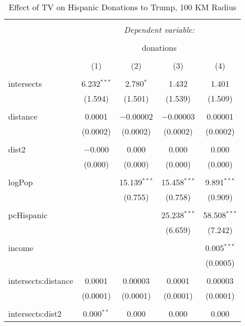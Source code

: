 
\begin{table}[!htbp] \centering 
  \caption{Effect of TV on Hispanic Donations to Trump, 100 KM Radius} 
  \label{} 
\begin{tabular}{@{\extracolsep{-5pt}}lcccc} 
\\[-1.8ex]\hline 
\hline \\[-1.8ex] 
 & \multicolumn{4}{c}{\textit{Dependent variable:}} \\ 
\cline{2-5} 
\\[-1.8ex] & \multicolumn{4}{c}{donations} \\ 
\\[-1.8ex] & (1) & (2) & (3) & (4)\\ 
\hline \\[-1.8ex] 
 intersects & 6.232$^{***}$ & 2.780$^{*}$ & 1.432 & 1.401 \\ 
  & (1.594) & (1.501) & (1.539) & (1.509) \\ 
  & & & & \\ 
 distance & 0.0001 & $-$0.00002 & $-$0.00003 & 0.00001 \\ 
  & (0.0002) & (0.0002) & (0.0002) & (0.0002) \\ 
  & & & & \\ 
 dist2 & $-$0.000 & 0.000 & 0.000 & 0.000 \\ 
  & (0.000) & (0.000) & (0.000) & (0.000) \\ 
  & & & & \\ 
 logPop &  & 15.139$^{***}$ & 15.458$^{***}$ & 9.891$^{***}$ \\ 
  &  & (0.755) & (0.758) & (0.909) \\ 
  & & & & \\ 
 pcHispanic &  &  & 25.238$^{***}$ & 58.508$^{***}$ \\ 
  &  &  & (6.659) & (7.242) \\ 
  & & & & \\ 
 income &  &  &  & 0.005$^{***}$ \\ 
  &  &  &  & (0.0005) \\ 
  & & & & \\ 
 intersects:distance & 0.0001 & 0.00003 & 0.0001 & 0.00003 \\ 
  & (0.0001) & (0.0001) & (0.0001) & (0.0001) \\ 
  & & & & \\ 
 intersects:dist2 & 0.000$^{**}$ & 0.000 & 0.000 & 0.000 \\ 

\end{tabular}
\end{table}
